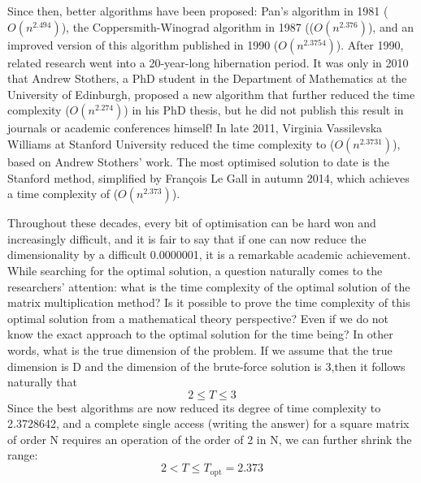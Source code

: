 \documentclass[UTF8]{ctexart}
\begin{document}
Since then, better algorithms have been proposed: Pan's algorithm\cite{pan1981new} in 1981 (\(O(n^{2.494})\)), the Coppersmith-Winograd algorithm\cite{COPPERSMITH1990251} in 1987 ((\(O(n^{2.376})\)), and an improved version of this algorithm published in 1990 (\(O(n^{2.3754})\)). After 1990, related research went into a 20-year-long hibernation period. It was only in 2010 that Andrew Stothers, a PhD student in the Department of Mathematics at the University of Edinburgh, proposed a new algorithm\cite{HARVEY20181} that further reduced the time complexity (\(O(n^{2.274})\)) in his PhD thesis, but he did not publish this result in journals or academic conferences himself! In late 2011, Virginia Vassilevska Williams at Stanford University reduced the time complexity\cite{article} to (\(O(n^{2.3731})\)), based on Andrew Stothers' work. The most optimised solution\cite{1401.7714} to date is the Stanford method, simplified by François Le Gall in autumn 2014, which achieves a time complexity of (\(O(n^{2.373})\)).

Throughout these decades, every bit of optimisation can be hard won and increasingly difficult, and it is fair to say that if one can now reduce the dimensionality by a difficult 0.0000001, it is a remarkable academic achievement. While searching for the optimal solution, a question naturally comes to the researchers' attention: what is the time complexity of the optimal solution of the matrix multiplication method? Is it possible to prove the time complexity of this optimal solution from a mathematical theory perspective? Even if we do not know the exact approach to the optimal solution for the time being? In other words, what is the true dimension of the problem. If we assume that the true dimension is D and the dimension of the brute-force solution is 3,then it follows naturally that
\begin{equation}
  2\leqslant T\leqslant 3
\end{equation}
Since the best algorithms are now reduced its degree of time complexity to 2.3728642, and a complete single access (writing the answer) for a square matrix of order N requires an operation of the order of 2 in N, we can further shrink the range:
\begin{equation}
  2< T\leqslant T_{\text{opt}}=2.373
\end{equation}
\end{document}
